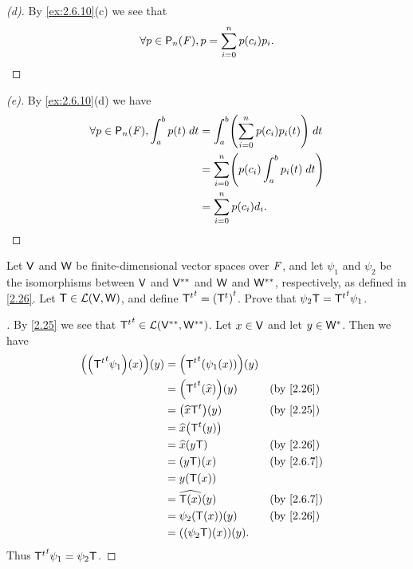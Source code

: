 \begin{proof}[(d)]
  By \cref{ex:2.6.10}(c) we see that
  \[
    \forall p \in \ps[n]{\F}, p = \sum_{i = 0}^n p(c_i) p_i.
  \]
\end{proof}

\begin{proof}[(e)]
  By \cref{ex:2.6.10}(d) we have
  \begin{align*}
    \forall p \in \ps[n]{\F}, \int_a^b p(t) \; dt & = \int_a^b \pa{\sum_{i = 0}^n p(c_i) p_i(t)} \; dt \\
                                                  & = \sum_{i = 0}^n \pa{p(c_i) \int_a^b p_i(t) \; dt} \\
                                                  & = \sum_{i = 0}^n p(c_i) d_i.
  \end{align*}
\end{proof}

\begin{ex}\label{ex:2.6.11}
  Let \(\mathsf{V}\) and \(\mathsf{W}\) be finite-dimensional vector spaces over \(\mathit{F}\), and let \(\psi_1\) and \(\psi_2\) be the isomorphisms between \(\mathsf{V}\) and \(\mathsf{V}^{**}\) and \(\mathsf{W}\) and \(\mathsf{W}^{**}\), respectively, as defined in \cref{2.26}.
  Let \(\mathsf{T} \in \mathcal{L}(\mathsf{V}, \mathsf{W})\), and define \({{\mathsf{T}}^{t}}^{t} = {\left\lparen{\mathsf{T}}^{t}\right\rparen}^{t}\).
  Prove that \(\psi_2 \mathsf{T} = {{\mathsf{T}}^{t}}^{t} \psi_1\).
\end{ex}

\begin{proof}[]
  By \cref{2.25} we see that \({{\mathsf{T}}^{t}}^{t} \in \mathcal{L}(\mathsf{V}^{**}, \mathsf{W}^{**})\).
  Let \(x \in \mathsf{V}\) and let \(y \in \mathsf{W}^*\).
  Then we have
  \begin{align*}
    \pa{\pa{\tp{\tp{\T}} \psi_1}(x)}(y) & = \pa{\tp{\tp{\T}}(\psi_1(x))}(y)                                 \\
                                        & = \pa{\tp{\tp{\T}}(\widehat{x})}(y) &  & \text{(by \cref{2.26})}  \\
                                        & = \pa{\widehat{x} \tp{\T}}(y)       &  & \text{(by \cref{2.25})}  \\
                                        & = \widehat{x}\pa{\tp{\T}(y)}                                      \\
                                        & = \widehat{x}(y \T)                 &  & \text{(by \cref{2.26})}  \\
                                        & = (y \T)(x)                         &  & \text{(by \cref{2.6.7})} \\
                                        & = y(\T(x))                                                        \\
                                        & = \widehat{\T(x)}(y)                &  & \text{(by \cref{2.6.7})} \\
                                        & = \psi_2(\T(x))(y)                  &  & \text{(by \cref{2.26})}  \\
                                        & = ((\psi_2 \T)(x))(y).
  \end{align*}
  Thus \({{\mathsf{T}}^{t}}^{t} \psi_1 = \psi_2 \mathsf{T}\).
\end{proof}

